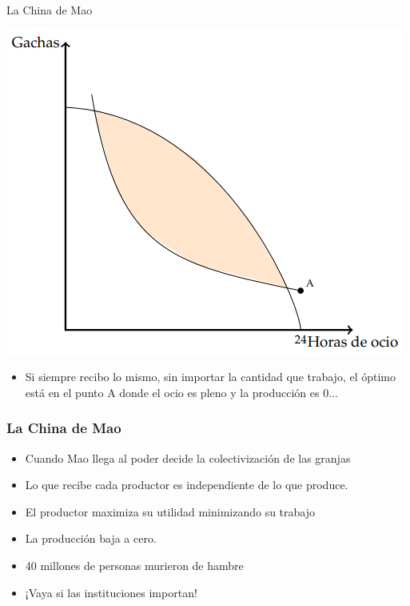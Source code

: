 \documentclass{beamer}
\begin{document}
\begin{frame}{La China de Mao}
    \begin{center}
        \includegraphics[scale=0.6]{../Figures/C19.15.png}
    \end{center}
    \begin{itemize}
        \item Si siempre recibo lo mismo, sin importar la cantidad que trabajo, el óptimo está en el punto A donde el ocio es pleno y la producción es 0... 
    \end{itemize}
\end{frame}

\begin{frame}
\frametitle{La China de Mao }
\begin{itemize}
    \item Cuando Mao llega al poder decide la colectivización de las granjas
    \item Lo que recibe cada productor es independiente de lo que produce. 
    
    \item El productor maximiza su utilidad minimizando su trabajo 
     \item La producción baja a cero.  
     \item 40 millones de personas murieron de hambre
     \item ¡Vaya si las instituciones importan! 
\end{itemize}

\end{frame}
\end{document}
